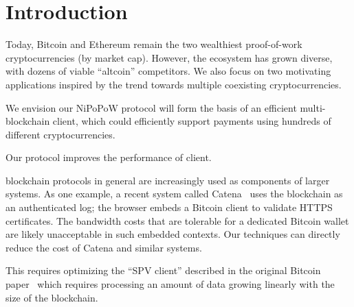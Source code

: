 \section{Introduction}



%
Today, Bitcoin and Ethereum remain the two wealthiest
proof-of-work cryptocurrencies (by market cap). However, the ecosystem has grown diverse,
with dozens of viable ``altcoin'' competitors.
We also focus on two motivating applications inspired by the trend towards multiple coexisting cryptocurrencies.

%
We envision our NiPoPoW protocol will form the basis of an
efficient multi-blockchain client, which could efficiently support payments
using hundreds of different cryptocurrencies. 

Our protocol improves the performance of client.

blockchain protocols in general
are increasingly used as components of larger systems. As one example, a recent system called
Catena~\cite{catena} uses the blockchain as an authenticated log; the browser
embeds a Bitcoin client to validate HTTPS certificates. The bandwidth costs that
are tolerable for a dedicated Bitcoin wallet are likely unacceptable in such
embedded contexts. Our techniques can directly reduce the cost of Catena and
similar systems.

This requires optimizing the ``SPV
client'' described in the original Bitcoin paper~\cite{bitcoin} which requires
processing an amount of data growing linearly with the size of the blockchain.





